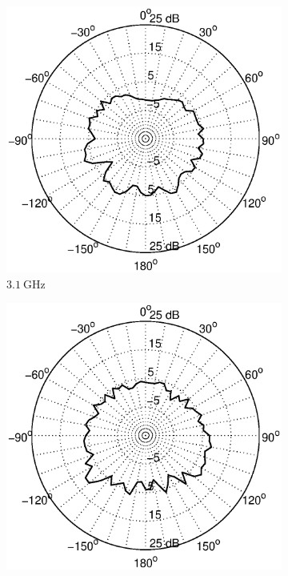 \documentclass[a4paper]{article}        %
\begin{document}
		\begin{figure}[H]
		\begin{subfigure}{0.5\textwidth}
			\includegraphics[width=\textwidth]{images/antenna/radpat_azi_3G.eps}
			\caption{$\SI{3.1}{\giga\hertz}$}
		\end{subfigure}
		\begin{subfigure}{0.5\textwidth}
			\includegraphics[width=\textwidth]{images/antenna/radpat_azi_4_3G.eps}

\end{subfigure}
\end{figure}
\end{document}
